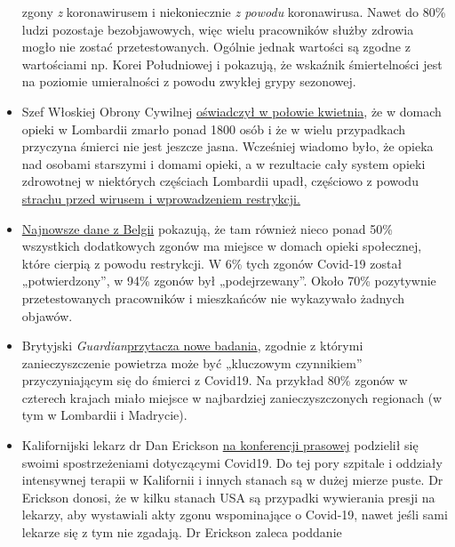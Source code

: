 \begin{itemize}
  zgony \emph{z} koronawirusem i niekoniecznie \emph{z powodu}
  koronawirusa. Nawet do 80\% ludzi pozostaje bezobjawowych, więc wielu
  pracowników służby zdrowia mogło nie zostać przetestowanych. Ogólnie
  jednak wartości są zgodne z wartościami np. Korei Południowej i
  pokazują, że wskaźnik śmiertelności jest na poziomie umieralności z
  powodu zwykłej grypy sezonowej.
\item
  Szef Włoskiej Obrony Cywilnej
  \href{https://www.theguardian.com/world/2020/apr/16/italian-police-broaden-care-home-coronavirus-milan}{oświadczył
  w połowie kwietnia}, że w domach opieki w Lombardii zmarło ponad 1800
  osób i że w wielu przypadkach przyczyna śmierci nie jest jeszcze
  jasna. Wcześniej wiadomo było, że opieka nad osobami starszymi i
  domami opieki, a w rezultacie cały system opieki zdrowotnej w
  niektórych częściach Lombardii upadł, częściowo z powodu
  \href{https://swprs.org/covid-19-a-report-from-italy/}{strachu przed
  wirusem i wprowadzeniem restrykcji.}
\item
  \href{https://covid-19.sciensano.be/sites/default/files/Covid19/Meest\%20recente\%20update.pdf}{Najnowsze
  dane z Belgii} pokazują, że tam również nieco ponad 50\% wszystkich
  dodatkowych zgonów ma miejsce w domach opieki społecznej, które
  cierpią z powodu restrykcji. W 6\% tych zgonów Covid-19 został
  „potwierdzony'', w 94\% zgonów był „podejrzewany''. Około 70\%
  pozytywnie przetestowanych pracowników i mieszkańców nie wykazywało
  żadnych objawów.
\item
  Brytyjski
  \emph{Guardian}\href{https://www.theguardian.com/environment/2020/apr/20/air-pollution-may-be-key-contributor-to-covid-19-deaths-study?utm_medium}{przytacza
  nowe badania}, zgodnie z którymi zanieczyszczenie powietrza może być
  „kluczowym czynnikiem'' przyczyniającym się do śmierci z Covid19. Na
  przykład 80\% zgonów w czterech krajach miało miejsce w najbardziej
  zanieczyszczonych regionach (w tym w Lombardii i Madrycie).
\item
  Kalifornijski lekarz dr Dan Erickson
  \href{https://www.turnto23.com/news/coronavirus/video-interview-with-dr-dan-erickson-and-dr-artin-massihi-taken-down-from-youtube}{na
  konferencji prasowej} podzielił się swoimi spostrzeżeniami dotyczącymi
  Covid19. Do tej pory szpitale i oddziały intensywnej terapii w
  Kalifornii i innych stanach są w dużej mierze puste. Dr Erickson
  donosi, że w kilku stanach USA są przypadki wywierania presji na
  lekarzy, aby wystawiali akty zgonu wspominające o Covid-19, nawet
  jeśli sami lekarze się z tym nie zgadają. Dr Erickson zaleca poddanie

\end{itemize}
